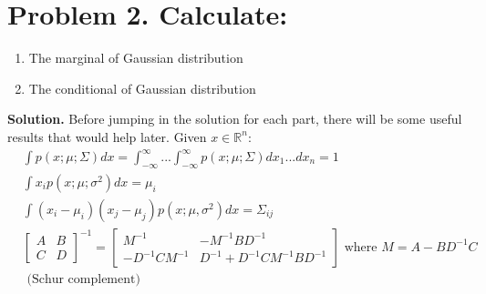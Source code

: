 \documentclass[a4paper, 10pt]{article}  %
\begin{document}
\section{Problem 2. Calculate:}
\begin{enumerate}[label=(\alph*)]
    \item The marginal of Gaussian distribution
    \item The conditional of Gaussian distribution
\end{enumerate}
\textbf{Solution.}
Before jumping in the solution for each part, there will be some useful results that would help later. Given $x \in \mathbb{R}^n$:
\begin{align}
    & \int p(x; \mu; \Sigma) dx = \int_{-\infty}^\infty ... \int_{-\infty}^\infty p(x; \mu; \Sigma)dx_1 ... dx_n = 1 \\
    & \int x_i p(x; \mu; \sigma^2)dx = \mu_i \\
    & \int (x_i - \mu_i)(x_j - \mu_j) p(x; \mu, \sigma^2) dx = \Sigma_{ij} \\
    & \left[ \begin{array}{cc}
        A & B \\
        C & D
    \end{array} \right]^{-1}
    = \left[ \begin{array}{cc}
        M^{-1} & -M^{-1}BD^{-1} \\
        -D^{-1} C M^{-1} & D^{-1} + D^{-1} C M^{-1} B D^{-1} \end{array}\right] \text{ where } M = A - B D^{-1} C \\
        & \text{ (Schur complement)} \nonumber
\end{align}
\end{document}
